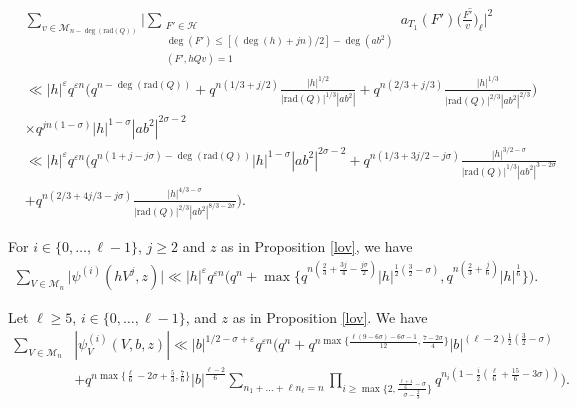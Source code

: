 \documentclass[10pt,a4paper]{amsart}
\begin{document}
 \begin{align}
& \sum_{v \in \mathcal{M}_{n - \deg(\text{rad}(Q))}}  \Bigg| \sum_{\substack{F' \in \mathcal{H} \\  \deg(F') \leq [(\deg(h)+jn)/2]-\deg(ab^2) \nonumber  \\ (F',hQv)=1}} a_{T_1}(F') \overline{\Big( \frac{F'}{v}\Big)_{\ell}} \Bigg|^2\\
 &  \ll |h|^{\varepsilon} q^{\varepsilon n} \Bigg(q^{n-\deg(\text{rad}(Q))}+q^{n(1/3+j/2)} \frac{|h|^{1/2}}{|\text{rad}(Q)|^{1/3} |ab^2|}+q^{n(2/3+j/3)} \frac{|h|^{1/3}}{|\text{rad}(Q)|^{2/3}|ab^2|^{2/3}} \Bigg)   \nonumber \\
 & \times q^{jn(1-\sigma)} |h|^{1-\sigma} |ab^2|^{2\sigma-2} \nonumber \\
 & \ll |h|^{\varepsilon} q^{\varepsilon n} \Bigg(q^{n(1+j-j\sigma)-\deg(\text{rad}(Q))} |h|^{1-\sigma} |ab^2|^{2\sigma-2} + q^{n (1/3+3j/2-j \sigma)} \frac{|h|^{3/2-\sigma}}{|\text{rad}(Q)|^{1/3} |ab^2|^{3-2\sigma}} \nonumber\\
 & +q^{n(2/3+4j/3-j \sigma)} \frac{|h|^{4/3-\sigma}}{|\text{rad}(Q)|^{2/3}|ab^2|^{8/3-2\sigma}}\Bigg). \label{sumv}
\end{align} 

\begin{corollary}
\label{cor_lov}
For $i \in \{0,\ldots,\ell-1\}$, $j \geq 2$ and $z$ as in Proposition \ref{lov}, we have
\begin{align*}
 \sum_{V \in \mathcal{M}_n} \Big|  \psi^{(i)}(hV^j,z)\Big| \ll |h|^{\varepsilon} q^{\varepsilon n} \Big(q^n + \max \{ q^{n(\frac{2}{3} + \frac{3j}{4} - \frac{j \sigma}{2})} |h|^{\frac{1}{2} (\frac{3}{2}-\sigma)}, q^{n (\frac{2}{3}+\frac{j}{6})} |h|^{\frac{1}{6}}\} \Big).
 \end{align*}
\end{corollary}  

 \begin{proposition}
Let $\ell \geq 5$, $i \in \{0,\ldots, \ell-1\}$, and $z$ as in Proposition  \ref{lov}. We have
\begin{align*}
\sum_{V \in \mathcal{M}_n} & |\psi^{(i)}_V(V,b,z)|   \ll |b|^{1/2-\sigma+\varepsilon} q^{\varepsilon n} \Big(q^n +q^{ n \max\{ \frac{\ell(9-6\sigma)-6\sigma-1}{12} , \frac{7-2\sigma}{4} \}} |b|^{(\ell-2)\frac{1}{2} (\frac{3}{2}-\sigma)}\\
& +q^{n \max\{ \frac{\ell}{6}-2\sigma+\frac{5}{3}, \frac{7}{6} \}} |b|^{\frac{\ell-2}{6}} \sum_{n_1+\ldots+\ell n_{\ell}=n}  \prod_{i \geq \max\{2, \frac{ \frac{\ell+1}{6} -\sigma}{\sigma-\frac{2}{3}} \}} q^{n_i (1-\frac{i}{2} ( \frac{\ell}{6} +\frac{15}{6}-3\sigma))}  \Big).
\end{align*}



 \end{proposition}
\end{document}

